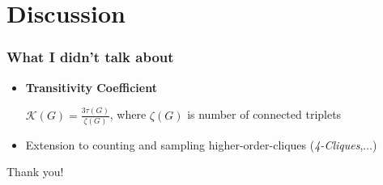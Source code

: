\documentclass[11pt]{beamer}
\begin{document}
\section{Discussion}
\begin{frame}
\frametitle{What I didn't talk about}
\begin{itemize}
\item \textbf{Transitivity Coefficient}
\begin{center}
$\mathcal{K}(G)=\frac{3\tau(G)}{\zeta(G)}$, where $\zeta(G)$ is number of connected triplets
\end{center}
\item Extension to counting and sampling higher-order-cliques (\textit{4-Cliques},$\dots$)
\end{itemize}
\end{frame}

\begin{frame}
\begin{center}
Thank you!
\end{center}
\end{frame}
\end{document}
